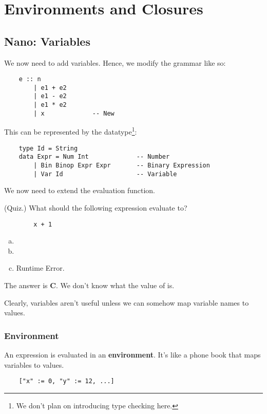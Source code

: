 \documentclass[letterpaper]{article}
\begin{document}
\section{Environments and Closures}
\subsection{Nano: Variables}
We now need to add variables. Hence, we modify the grammar like so: 
\begin{verbatim}
    e :: n 
        | e1 + e2 
        | e1 - e2 
        | e1 * e2 
        | x             -- New \end{verbatim}
This can be represented by the datatype\footnote{We don't plan on introducing type checking here.}: 
\begin{verbatim}
    type Id = String 
    data Expr = Num Int             -- Number 
        | Bin Binop Expr Expr       -- Binary Expression
        | Var Id                    -- Variable \end{verbatim}

We now need to extend the evaluation function.

\begin{mdframed}[]
    (Quiz.) What should the following expression evaluate to? 
    \begin{verbatim}
        x + 1\end{verbatim}
    \begin{enumerate}[(a)]
        \item {}
        \item {}
        \item Runtime Error.
    \end{enumerate}

    \begin{mdframed}[]
        The answer is \textbf{C}. We don't know what the value of  is.
    \end{mdframed}
\end{mdframed}
Clearly, variables aren't useful unless we can somehow map variable names to values. 

\subsubsection{Environment}
An expression is evaluated in an \textbf{environment}. It's like a phone book that maps variables to values. 
\begin{verbatim}
    ["x" := 0, "y" := 12, ...]\end{verbatim}
\end{document}
